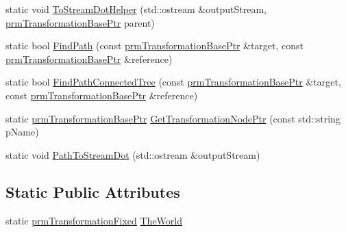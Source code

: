 \begin{DoxyCompactItemize}
static void \hyperlink{classprm_transformation_manager_a22d0b0f7d90c74e21bde7bfaf5729392}{To\-Stream\-Dot\-Helper} (std\-::ostream \&output\-Stream, \hyperlink{prm_transformation_base_8h_a881a6a7d2191474974cdf36d79e1df08}{prm\-Transformation\-Base\-Ptr} parent)
\item 
static bool \hyperlink{classprm_transformation_manager_acf4eabfe454d2e25d2849e90351287de}{Find\-Path} (const \hyperlink{prm_transformation_base_8h_a881a6a7d2191474974cdf36d79e1df08}{prm\-Transformation\-Base\-Ptr} \&target, const \hyperlink{prm_transformation_base_8h_a881a6a7d2191474974cdf36d79e1df08}{prm\-Transformation\-Base\-Ptr} \&reference)
\item 
static bool \hyperlink{classprm_transformation_manager_ae584d612affb33042f0e3c48f84bc8f6}{Find\-Path\-Connected\-Tree} (const \hyperlink{prm_transformation_base_8h_a881a6a7d2191474974cdf36d79e1df08}{prm\-Transformation\-Base\-Ptr} \&target, const \hyperlink{prm_transformation_base_8h_a881a6a7d2191474974cdf36d79e1df08}{prm\-Transformation\-Base\-Ptr} \&reference)
\item 
static \hyperlink{prm_transformation_base_8h_a881a6a7d2191474974cdf36d79e1df08}{prm\-Transformation\-Base\-Ptr} \hyperlink{classprm_transformation_manager_a8632cf33976e0a3d07b6d333d2de512c}{Get\-Transformation\-Node\-Ptr} (const std\-::string p\-Name)
\item 
static void \hyperlink{classprm_transformation_manager_a850c9d896cb8eb8e2570e3f8bbe7700b}{Path\-To\-Stream\-Dot} (std\-::ostream \&output\-Stream)
\end{DoxyCompactItemize}
\subsection*{Static Public Attributes}
\begin{DoxyCompactItemize}
\item 
static \hyperlink{classprm_transformation_fixed}{prm\-Transformation\-Fixed} \hyperlink{classprm_transformation_manager_a565dcc8b21bc6ffa31c62c638b540867}{The\-World}
\end{DoxyCompactItemize}
